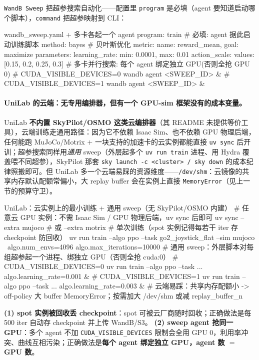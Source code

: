 \verb|WandB Sweep| 把超参搜索自动化——配置里 \verb|program| 是必填（agent 要知道启动哪个脚本），\verb|command| 把超参映射到 CLI：

\begin{codebox}[text]{wandb\_sweep.yaml + 多卡各起一个 agent}
program: train                     # 必填: agent 据此启动训练脚本
method: bayes                      # 贝叶斯优化
metric: {name: reward_mean, goal: maximize}
parameters:
  learning_rate: {min: 0.0001, max: 0.01}
  action_scale:  {values: [0.15, 0.2, 0.25, 0.3]}
# 多卡并行搜索: 每个 agent 绑定独立 GPU(否则全抢 GPU 0)
#   CUDA_VISIBLE_DEVICES=0 wandb agent <SWEEP_ID> &
#   CUDA_VISIBLE_DEVICES=1 wandb agent <SWEEP_ID> &
\end{codebox}

\paragraph{UniLab 的云端：无专用编排器，但有一个 GPU-sim 框架没有的成本变量。}UniLab \textbf{不内置 SkyPilot/OSMO 这类云编排器}（其 README 未提供等价工具），云端训练走通用路径：因为它不依赖 Isaac Sim、也不依赖 GPU 物理后端，任何能跑 MuJoCo/Motrix $+$ 一块支持的加速卡的云实例都能直接 \verb|uv sync| 后开训；超参搜索同样用\emph{通用} sweep（外层起多个 \verb|uv run train| 进程、用 Hydra 覆盖喂不同超参），SkyPilot 那套 \verb|sky launch -c <cluster> / sky down| 的成本纪律照搬即可。但 UniLab 多一个云端易踩的资源维度——\verb|/dev/shm|：云镜像的共享内存默认配额常偏小，大 replay buffer 会在实例上直接 \verb|MemoryError|（见上一节的预算守卫）。

\begin{codebox}[bash]{UniLab：云实例上的最小训练 + 通用 sweep（无 SkyPilot/OSMO 内建）}
# 任意云 GPU 实例：不需 Isaac Sim / GPU 物理后端，uv sync 后即可
uv sync --extra mujoco            # 或 --extra motrix
# 单次训练（spot 实例记得每若干 iter 存 checkpoint 防回收）
uv run train --algo ppo --task go2_joystick_flat --sim mujoco \
    algo.num_envs=4096 algo.max_iterations=10000
# 通用 sweep：外层脚本对每组超参起一个进程、绑独立 GPU（否则全抢 cuda:0）
#   CUDA_VISIBLE_DEVICES=0 uv run train --algo ppo --task ... algo.learning_rate=0.001 &
#   CUDA_VISIBLE_DEVICES=1 uv run train --algo ppo --task ... algo.learning_rate=0.003 &
# 云端易踩：共享内存配额小 -> off-policy 大 buffer MemoryError；按需加大 /dev/shm 或减 replay_buffer_n
\end{codebox}

\begin{pitfall}
\textbf{(1) spot 实例被回收丢 checkpoint}：spot 可被云厂商随时回收；正确做法是每 500 iter 自动存 checkpoint 并上传 WandB/S3。
\textbf{(2) sweep agent 抢同一 GPU}：多个 agent 不加 \verb|CUDA_VISIBLE_DEVICES| 限制会全用 GPU 0，利用率冲突、曲线互相污染；正确做法是\textbf{每个 agent 绑定独立 GPU，agent 数 $=$ GPU 数}。
\end{pitfall}

